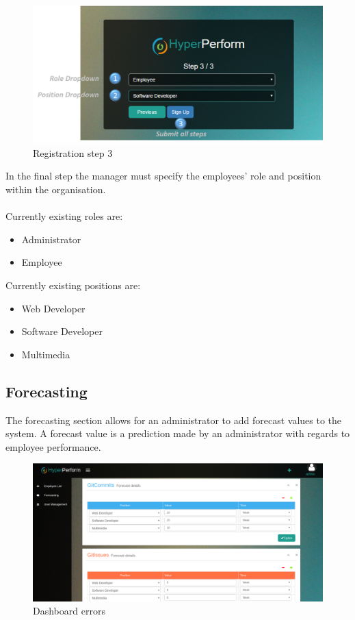 \documentclass[11pt,a4paper]{article}
\begin{document}
\begin{figure}[H]
	\begin{center}
		\includegraphics[width=\linewidth]{../Images/Getting_Started/Step_3_numbered}
		\caption{Registration step 3}
	\end{center}
\end{figure}

\noindent
In the final step the manager must specify the employees' role and position within the organisation. \\ \\
\noindent
Currently existing roles are:
\begin{itemize}
	\item Administrator
	\item Employee \\
\end{itemize}
\noindent
Currently existing positions are:
\begin{itemize}
	\item Web Developer
	\item Software Developer
	\item Multimedia
\end{itemize}

\pagebreak

\subsection{Forecasting}
The forecasting section allows for an administrator to add forecast values to the system. A forecast value is a prediction made by an administrator with regards to employee performance.
\begin{figure}[H]
	\begin{center}
		\includegraphics[width=\linewidth]{../Images/Getting_Started/forecast}
		\caption{Dashboard errors}
	\end{center}
\end{figure}
\end{document}
